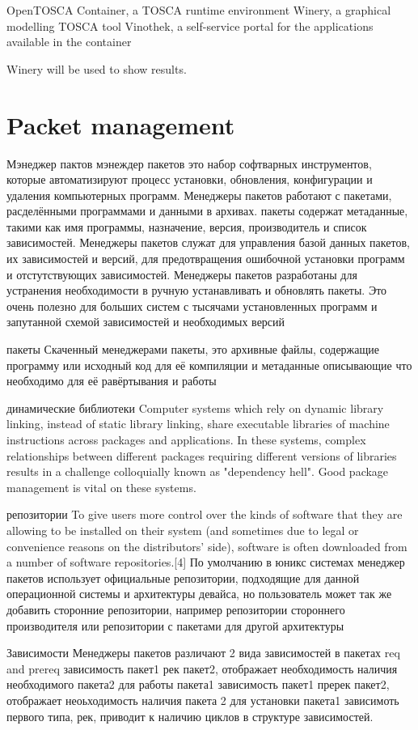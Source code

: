 OpenTOSCA Container, a TOSCA runtime environment
Winery, a graphical modelling TOSCA tool
Vinothek, a self-service portal for the applications available in the container

Winery will be used to show results.
\section{Packet management} \label{sec:pm}

Мэнеджер пактов
мэнеждер пакетов это набор софтварных инструментов, которые автоматизируют процесс установки, обновления, конфигурации и удаления компьютерных программ. 
Менеджеры пакетов работают с пакетами, расделёнными программами и данными в архивах. пакеты содержат метаданные, такими как имя программы, назначение, версия, производитель и список зависимостей. 
Менеджеры пакетов служат для управления базой данных пакетов, их зависимостей и версий, для предотвращения ошибочной установки программ и отстутствующих зависимостей. 
Менеджеры пакетов разработаны для устранения необходимости в ручную устанавливать и обновлять пакеты. Это очень полезно для больших систем с тысячами установленных программ и запутанной схемой зависимостей и необходимых версий

пакеты
Скаченный менеджерами пакеты, это архивные файлы, содержащие программу или исходный код для её компиляции и метаданные описывающие что необходимо для её равёртывания и работы 

динамические библиотеки
Computer systems which rely on dynamic library linking, instead of static library linking, share executable libraries of machine instructions across packages and applications. In these systems, complex relationships between different packages requiring different versions of libraries results in a challenge colloquially known as "dependency hell".  Good package management is vital on these systems.

репозитории 
To give users more control over the kinds of software that they are allowing to be installed on their system (and sometimes due to legal or convenience reasons on the distributors' side), software is often downloaded from a number of software repositories.[4]
По умолчанию в юникс системах менеджер пакетов использует официальные репозитории, подходящие для данной операционной системы и архитектуры девайса, но пользователь может так же добавить сторонние репозитории, например репозитории стороннего производителя или репозитории с пакетами для другой архитектуры

Зависимости
Менеджеры пакетов различают 2 вида зависимостей в пакетах req and prereq
зависимость  пакет1 рек пакет2, отображает необходимость наличия необходимого пакета2 для работы пакета1
зависимость пакет1 пререк пакет2, отображает неоьходимость наличия пакета 2 для установки пакета1
зависимоть первого типа, рек, приводит к наличию циклов в структуре зависимостей.
\fi


